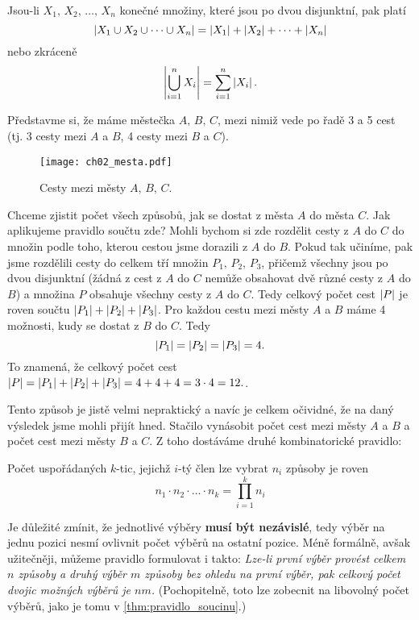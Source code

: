 \begin{theorem}\label{thm:pravidlo_souctu}
    Jsou-li $X_1,\,X_2,\,\dots,\,X_n$ konečné množiny, které jsou po dvou disjunktní, pak platí
    \begin{equation*}
        \left| X_1\cup X_2\cup\dots\cup X_n \right|=\left| X_1 \right|+\left| X_2 \right|+\dots+\left| X_n \right|
    \end{equation*}
    nebo zkráceně
    \begin{equation*}
        \left| \bigcup\limits_{i=1}^{n}X_i \right|=\sum_{i=1}^{n}\left| X_i \right|.
    \end{equation*}
\end{theorem}

Představme si, že máme městečka $A,\,B,\,C$, mezi nimiž vede po řadě 3 a 5 cest (tj. 3 cesty mezi $A$ a $B$, 4 cesty mezi $B$ a $C$).

\begin{figure}[H]
	\centering
	\texttt{[image: ch02\_mesta.pdf]}
    \caption{Cesty mezi městy $A,\,B,\,C$.}
    \label{fig:mesta}
\end{figure}

Chceme zjistit počet všech způsobů, jak se dostat z města $A$ do města $C$. Jak aplikujeme pravidlo součtu zde? Mohli bychom si zde rozdělit cesty z $A$ do $C$ do množin podle toho, kterou cestou jsme dorazili z $A$ do $B$. Pokud tak učiníme, pak jsme rozdělili cesty do celkem tří množin $P_1,\,P_2,\,P_3$, přičemž všechny jsou po dvou disjunktní (žádná z cest z $A$ do $C$ nemůže obsahovat dvě různé cesty z $A$ do $B$) a množina $P$ obsahuje všechny cesty z $A$ do $C$. Tedy celkový počet cest $\left| P \right|$ je roven součtu $\left| P_1 \right|+\left| P_2 \right|+\left| P_3 \right|$. Pro každou cestu mezi městy $A$ a $B$ máme 4 možnosti, kudy se dostat z $B$ do $C$. Tedy
\begin{equation*}
    \left| P_1 \right|=\left| P_2 \right|=\left| P_3 \right|=4.
\end{equation*}
To znamená, že celkový počet cest $\left| P \right|=\left| P_1 \right|+\left| P_2 \right|+\left| P_3 \right|=4+4+4=3\cdot 4=12.$.\par
Tento způsob je jistě velmi nepraktický a navíc je celkem očividné, že na daný výsledek jsme mohli přijít hned. Stačilo vynásobit počet cest mezi městy $A$ a $B$ a počet cest mezi městy $B$ a $C$. Z toho dostáváme druhé kombinatorické pravidlo:

\begin{theorem}\label{thm:pravidlo_soucinu}
    Počet uspořádaných $k$-tic, jejichž $i$-tý člen lze vybrat $n_i$ způsoby je roven
    \begin{equation*}
        n_1\cdot n_2\cdot\dots\cdot n_k = \prod_{i=1}^{k}n_i
    \end{equation*}
\end{theorem}
Je důležité zmínit, že jednotlivé výběry \textbf{musí být nezávislé}, tedy výběr na jednu pozici nesmí ovlivnit počet výběrů na ostatní pozice. Méně formálně, avšak užitečněji, můžeme pravidlo formulovat i takto: \textit{Lze-li první výběr provést celkem $n$ způsoby a druhý výběr $m$ způsoby bez ohledu na první výběr, pak celkový počet dvojic možných výběrů je $nm$.} (Pochopitelně, toto lze zobecnit na libovolný počet výběrů, jako je tomu v \ref{thm:pravidlo_soucinu}.)

